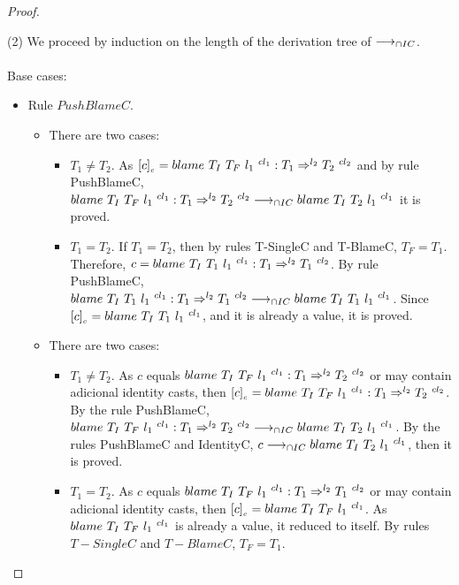 \documentclass[a4paper]{article}
\begin{document}
\begin{proof}
\begin{itemize}
\begin{itemize}
    \end{itemize}
\end{itemize}
(2) We proceed by induction on the length of the derivation tree of $\longrightarrow_{\cap IC}$.\\\\
Base cases:
\begin{itemize}
    \item Rule $PushBlameC$.
    \begin{itemize}
        \item There are two cases:
        \begin{itemize}
            \item $T_1 \neq T_2$.
            As $\erasec{c} = \blamecast{T_I}{T_F}{l_1}{cl_1} : T_1 \Rightarrow^{l_2} T_2\ ^{cl_2}$ and by rule PushBlameC, $blame\ T_I\ T_F\ l_1\ ^{cl_1} : T_1 \Rightarrow^{l_2} T_2\ ^{cl_2} \longrightarrow_{\cap IC} blame\ T_I\ T_2\ l_1\ ^{cl_1}$ it is proved.
            \item $T_1 = T_2$.
            If $T_1 = T_2$, then by rules T-SingleC and T-BlameC, $T_F = T_1$.
            Therefore, $c = \blamecast{T_I}{T_1}{l_1}{cl_1} : T_1 \Rightarrow^{l_2} T_1\ ^{cl_2}$.
            By rule PushBlameC, $blame\ T_I\ T_1\ l_1\ ^{cl_1} : T_1 \Rightarrow^{l_2} T_1\ ^{cl_2} \longrightarrow_{\cap IC} blame\ T_I\ T_1\ l_1\ ^{cl_1}$.
            Since $[c]_{_c} = blame\ T_I\ T_1\ l_1\ ^{cl_1}$, and it is already a value, it is proved.
        \end{itemize}
        \item There are two cases:
        \begin{itemize}
            \item $T_1 \neq T_2$.
            As $c$ equals $blame\ T_I\ T_F\ l_1\ ^{cl_1} : T_1 \Rightarrow^{l_2} T_2\ ^{cl_2}$ or may contain adicional identity casts, then $\erasec{c} = \blamecast{T_I}{T_F}{l_1}{cl_1} : T_1 \Rightarrow^{l_2} T_2\ ^{cl_2}$.
            By the rule PushBlameC, $blame\ T_I\ T_F\ l_1\ ^{cl_1} : T_1 \Rightarrow^{l_2} T_2\ ^{cl_2} \longrightarrow_{\cap IC} blame\ T_I\ T_2\ l_1\ ^{cl_1}$.
            By the rules PushBlameC and IdentityC, $c \longrightarrow_{\cap IC} blame\ T_I\ T_2\ l_1\ ^{cl_1}$, then it is proved.
            \item $T_1 = T_2$.
            As $c$ equals $blame\ T_I\ T_F\ l_1\ ^{cl_1} : T_1 \Rightarrow^{l_2} T_1\ ^{cl_2}$ or may contain adicional identity casts, then $[c]_{_c} = blame\ T_I\ T_F\ l_1\ ^{cl_1}$.
            As $blame\ T_I\ T_F\ l_1\ ^{cl_1}$ is already a value, it reduced to itself.
            By rules $T-SingleC$ and $T-BlameC$, $T_F = T_1$.

\end{itemize}
\end{itemize}
\end{itemize}
\end{proof}
\end{document}
